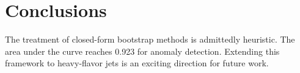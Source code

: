 \section{Conclusions}\label{sec:conclusions}

The treatment of closed-form bootstrap methods is admittedly heuristic.
The area under the curve reaches 0.923 for anomaly detection. Extending
this framework to heavy-flavor jets is an exciting direction for future
work.

